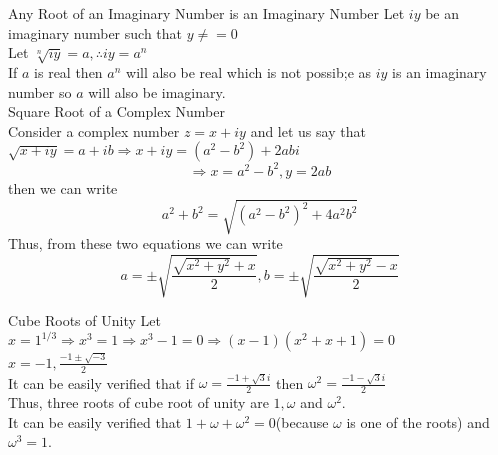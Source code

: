 \documentclass[aspectratio=169,8pt]{beamer}
\begin{document}
\begin{frame}{Any Root of an Imaginary Number is an Imaginary Number}
  Let $iy$ be an imaginary number such that $y\neq = 0$\\
  \vspace*{0.2cm}
  Let $\sqrt[n]{iy} = a, \therefore iy = a^n$\\
  \vspace*{0.2cm}
  If $a$ is real then $a^n$ will also be real which is not possib;e as $iy$ is an imaginary number so $a$ will also be imaginary.\\
  \vspace*{0.2cm}
  {\large Square Root of a Complex Number}\\
  \vspace*{0.2cm}
  Consider a complex number $z = x + iy$ and let us say that $\sqrt{x + iy} = a + ib \Rightarrow x + iy = (a^2 - b^2) + 2abi$\\
  $$\Rightarrow x = a^2 - b^2, y = 2ab$$
  then we can write
  $$a^2 + b^2 = \sqrt{(a^2 - b^2)^2 + 4a^2b^2}$$
  Thus, from these two equations we can write
  $$a = \pm\sqrt{\frac{\sqrt{x^2 + y^2} + x}{2}}, b = \pm\sqrt{\frac{\sqrt{x^2 + y^2} - x}{2}}$$
\end{frame}
\begin{frame}{Cube Roots of Unity}
  Let $x = 1^{1/3} \Rightarrow x^3 = 1 \Rightarrow x^3 - 1=0 \Rightarrow (x - 1)(x^2 + x + 1) = 0$\\
  \vspace*{0.2cm}
  $x = -1, \frac{-1\pm\sqrt{-3}}{2}$\\
  \vspace*{0.2cm}
  It can be easily verified that if $\omega = \frac{-1 + \sqrt{3}i}{2}$ then $\omega^2 = \frac{-1 - \sqrt{3}i}{2}$\\
  \vspace*{0.2cm}
  Thus, three roots of cube root of unity are $1, \omega$ and $\omega^2.$\\
  \vspace*{0.2cm}
  It can be easily verified that $1 + \omega + \omega^2 = 0$(because $\omega$ is one of the roots) and $\omega^3 = 1$.
\end{frame}
\end{document}
